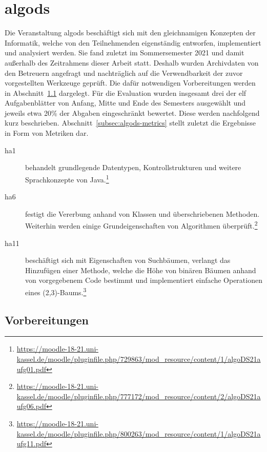 \section{\acl{algods}}\label{sec:algods-2021}

Die Veranstaltung \ac{algods} beschäftigt sich mit den gleichnamigen Konzepten der Informatik, welche von den Teilnehmenden eigenständig entworfen, implementiert und analysiert werden.
Sie fand zuletzt im Sommersemester 2021 und damit außerhalb des Zeitrahmens dieser Arbeit statt.
Deshalb wurden Archivdaten von den Betreuern angefragt und nachträglich auf die Verwendbarkeit der zuvor vorgestellten Werkzeuge geprüft.
Die dafür notwendigen Vorbereitungen werden in Abschnitt~\ref{subsec:algods-preparations} dargelegt.
Für die Evaluation wurden insgesamt drei der elf Aufgabenblätter von Anfang, Mitte und Ende des Semesters ausgewählt und jeweils etwa 20\% der Abgaben eingeschränkt bewertet.
Diese werden nachfolgend kurz beschrieben.
Abschnitt~\ref{subsec:algods-metrics} stellt zuletzt die Ergebnisse in Form von Metriken dar.

\begin{description}
    \item[\ac{ha}1] behandelt grundlegende Datentypen, Kontrollstrukturen und weitere Sprachkonzepte von Java.\footnote{
        \url{https://moodle-18-21.uni-kassel.de/moodle/pluginfile.php/729863/mod_resource/content/1/algoDS21aufg01.pdf}
    }
    \item[\ac{ha}6] festigt die Vererbung anhand von Klassen und überschriebenen Methoden.
    Weiterhin werden einige Grundeigenschaften von Algorithmen überprüft.\footnote{
        \url{https://moodle-18-21.uni-kassel.de/moodle/pluginfile.php/777172/mod_resource/content/2/algoDS21aufg06.pdf}
    }
    \item[\ac{ha}11] beschäftigt sich mit Eigenschaften von Suchbäumen, verlangt das Hinzufügen einer Methode, welche die Höhe von binären Bäumen anhand von vorgegebenem Code bestimmt und implementiert einfache Operationen eines (2,3)-Baums.\footnote{
        \url{https://moodle-18-21.uni-kassel.de/moodle/pluginfile.php/800263/mod_resource/content/1/algoDS21aufg11.pdf}
    }
\end{description}

\subsection{Vorbereitungen}\label{subsec:algods-preparations}

